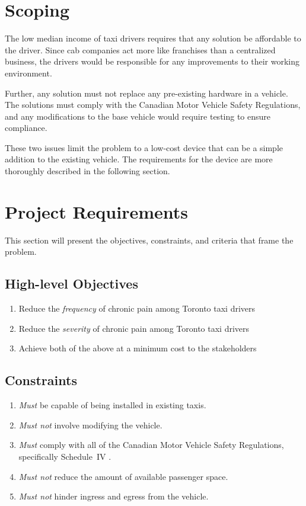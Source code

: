 \documentclass[11pt]{article}
\begin{document}
\section{Scoping}
The low median income of taxi drivers\cite{iTaxiWorkers2012} requires
that any solution be affordable to the driver. Since cab companies act
more like franchises than a centralized business, the drivers would be
responsible for any improvements to their working environment. 

Further, any solution must not replace any pre-existing hardware in a
vehicle. The solutions must comply with the Canadian Motor Vehicle
Safety Regulations\cite{motorregs}, and any modifications to the base
vehicle would require testing to ensure compliance. 

These two issues limit the problem to a low-cost device that can be a
simple addition to the existing vehicle. The requirements for the
device are more thoroughly described in the following section.
\section{Project Requirements}
\label{sec:requirements}
This section will present the objectives, constraints, and criteria 
that frame the problem.

\subsection{High-level Objectives}
\label{sec:high-level-objectives}

\begin{enumerate}
\item Reduce the \emph{frequency} of chronic pain among Toronto taxi drivers
\item Reduce the \emph{severity} of chronic pain among Toronto taxi drivers
\item Achieve both of the above at a minimum cost to the stakeholders
\end{enumerate}

\subsection{Constraints}
\begin{enumerate}
\item \emph{Must} be capable of being installed in existing taxis.
\item \emph{Must not} involve modifying the vehicle.
\item \emph{Must} comply with all of the Canadian Motor Vehicle Safety Regulations,
specifically Schedule~IV \cite{motorregs}.
\item \emph{Must not} reduce the amount of available passenger space.
\item \emph{Must not} hinder ingress and egress from the vehicle.
\end{enumerate}
\end{document}
